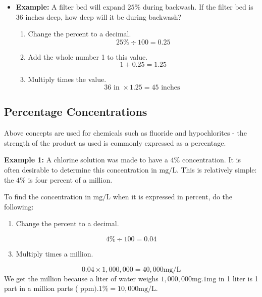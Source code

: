 \begin{itemize}
\item {}

\textbf{Example:} A filter bed will expand $25 \%$ during backwash. If the filter bed is 36 inches deep, how deep will it be during backwash?\\

\begin{enumerate}[Step 1.]
\item Change the percent to a decimal.
$$
25 \% \div 100=0.25
$$
\item Add the whole number 1 to this value.
$$
1+0.25=1.25
$$
\item Multiply times the value.
$$
36 \text { in } \times 1.25=45 \text { inches }
$$
\end{enumerate}
\end{itemize}
\subsection{Percentage Concentrations}
Above concepts are used for chemicals such as fluoride and hypochlorites - the strength of the product as used is commonly expressed as a percentage.

\textbf{Example 1:} A chlorine solution was made to have a $4 \%$ concentration. It is often desirable to determine this concentration in $\mathrm{mg} / \mathrm{L}$. This is relatively simple: the $4 \%$ is four percent of a million.

To find the concentration in $\mathrm{mg} / \mathrm{L}$ when it is expressed in percent, do the following:

\begin{enumerate}
  \item Change the percent to a decimal.
\end{enumerate}
$$
4 \% \div 100=0.04
$$

\begin{enumerate}
  \setcounter{enumi}{2}
  \item Multiply times a million.
\end{enumerate}
$$
0.04 \times 1,000,000=40,000 \mathrm{mg} / \mathrm{L}
$$
We get the million because a liter of water weighs $1,000,000 \mathrm{mg} .1 \mathrm{mg}$ in 1 liter is 1 part in a million parts ( $\mathrm{ppm}) .1 \%=10,000 \mathrm{mg} / \mathrm{L}$.


